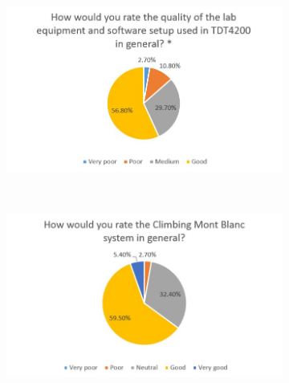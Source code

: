 \begin{figure}
    \centering
    \hspace*{-1.5cm}
    \begin{subfigure}[h]{0.4\textwidth}
        \includegraphics[width=1.5\textwidth, height=1.0\textwidth]{oldresults/equipment.jpg}
        \caption{}
        \label{fig:equipment}
    \end{subfigure}
    ~ %
    \hfill
    \begin{subfigure}[h]{0.4\textwidth}
        \includegraphics[width=1.5\textwidth, height=1.0\textwidth]{oldresults/cmb_general.jpg}

\end{subfigure}
\end{figure}
